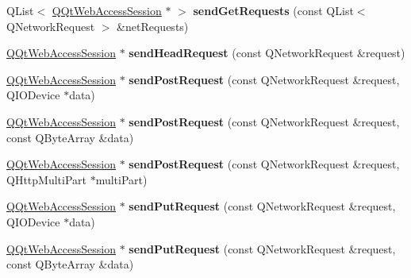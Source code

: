 \begin{DoxyCompactItemize}
Q\+List$<$ \mbox{\hyperlink{class_q_qt_web_access_session}{Q\+Qt\+Web\+Access\+Session}} $\ast$ $>$ {\bfseries send\+Get\+Requests} (const Q\+List$<$ Q\+Network\+Request $>$ \&net\+Requests)
\item 
\mbox{\label{class_q_qt_web_access_manager_a3e540e79abd9897799364173a66bf070}} 
\mbox{\hyperlink{class_q_qt_web_access_session}{Q\+Qt\+Web\+Access\+Session}} $\ast$ {\bfseries send\+Head\+Request} (const Q\+Network\+Request \&request)
\item 
\mbox{\label{class_q_qt_web_access_manager_ae8fd09a122868560a1e2bde52508306f}} 
\mbox{\hyperlink{class_q_qt_web_access_session}{Q\+Qt\+Web\+Access\+Session}} $\ast$ {\bfseries send\+Post\+Request} (const Q\+Network\+Request \&request, Q\+I\+O\+Device $\ast$data)
\item 
\mbox{\label{class_q_qt_web_access_manager_af98c24174d654fc2914271337c562124}} 
\mbox{\hyperlink{class_q_qt_web_access_session}{Q\+Qt\+Web\+Access\+Session}} $\ast$ {\bfseries send\+Post\+Request} (const Q\+Network\+Request \&request, const Q\+Byte\+Array \&data)
\item 
\mbox{\label{class_q_qt_web_access_manager_ac95febd0b792d7f26704180afdf3b117}} 
\mbox{\hyperlink{class_q_qt_web_access_session}{Q\+Qt\+Web\+Access\+Session}} $\ast$ {\bfseries send\+Post\+Request} (const Q\+Network\+Request \&request, Q\+Http\+Multi\+Part $\ast$multi\+Part)
\item 
\mbox{\label{class_q_qt_web_access_manager_a7b97b12b6504c5a662334d89d3e1e5d8}} 
\mbox{\hyperlink{class_q_qt_web_access_session}{Q\+Qt\+Web\+Access\+Session}} $\ast$ {\bfseries send\+Put\+Request} (const Q\+Network\+Request \&request, Q\+I\+O\+Device $\ast$data)
\item 
\mbox{\label{class_q_qt_web_access_manager_a4561670149c4251670ead3a885e754b8}} 
\mbox{\hyperlink{class_q_qt_web_access_session}{Q\+Qt\+Web\+Access\+Session}} $\ast$ {\bfseries send\+Put\+Request} (const Q\+Network\+Request \&request, const Q\+Byte\+Array \&data)
\item 
\mbox{\label{class_q_qt_web_access_manager_aaf3c744e4baa4f4b7f5702d210ecc79b}} 

\end{DoxyCompactItemize}
